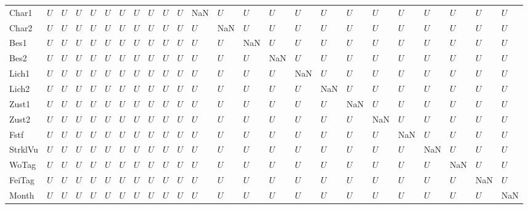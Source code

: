 \begin{tabular}{llllllllllllllllllllllll}
Char1   &     $U$ &  $U$ &  $U$ &   $U$ &   $U$ &   $U$ &   $U$ &   $U$ &   $U$ &   $U$ &   NaN &   $U$ &  $U$ &  $U$ &   $U$ &   $U$ &   $U$ &   $U$ &  $U$ &     $U$ &   $U$ &    $U$ &   $U$ \\
Char2   &     $U$ &  $U$ &  $U$ &   $U$ &   $U$ &   $U$ &   $U$ &   $U$ &   $U$ &   $U$ &   $U$ &   NaN &  $U$ &  $U$ &   $U$ &   $U$ &   $U$ &   $U$ &  $U$ &     $U$ &   $U$ &    $U$ &   $U$ \\
Bes1    &     $U$ &  $U$ &  $U$ &   $U$ &   $U$ &   $U$ &   $U$ &   $U$ &   $U$ &   $U$ &   $U$ &   $U$ &  NaN &  $U$ &   $U$ &   $U$ &   $U$ &   $U$ &  $U$ &     $U$ &   $U$ &    $U$ &   $U$ \\
Bes2    &     $U$ &  $U$ &  $U$ &   $U$ &   $U$ &   $U$ &   $U$ &   $U$ &   $U$ &   $U$ &   $U$ &   $U$ &  $U$ &  NaN &   $U$ &   $U$ &   $U$ &   $U$ &  $U$ &     $U$ &   $U$ &    $U$ &   $U$ \\
Lich1   &     $U$ &  $U$ &  $U$ &   $U$ &   $U$ &   $U$ &   $U$ &   $U$ &   $U$ &   $U$ &   $U$ &   $U$ &  $U$ &  $U$ &   NaN &   $U$ &   $U$ &   $U$ &  $U$ &     $U$ &   $U$ &    $U$ &   $U$ \\
Lich2   &     $U$ &  $U$ &  $U$ &   $U$ &   $U$ &   $U$ &   $U$ &   $U$ &   $U$ &   $U$ &   $U$ &   $U$ &  $U$ &  $U$ &   $U$ &   NaN &   $U$ &   $U$ &  $U$ &     $U$ &   $U$ &    $U$ &   $U$ \\
Zust1   &     $U$ &  $U$ &  $U$ &   $U$ &   $U$ &   $U$ &   $U$ &   $U$ &   $U$ &   $U$ &   $U$ &   $U$ &  $U$ &  $U$ &   $U$ &   $U$ &   NaN &   $U$ &  $U$ &     $U$ &   $U$ &    $U$ &   $U$ \\
Zust2   &     $U$ &  $U$ &  $U$ &   $U$ &   $U$ &   $U$ &   $U$ &   $U$ &   $U$ &   $U$ &   $U$ &   $U$ &  $U$ &  $U$ &   $U$ &   $U$ &   $U$ &   NaN &  $U$ &     $U$ &   $U$ &    $U$ &   $U$ \\
Fstf    &     $U$ &  $U$ &  $U$ &   $U$ &   $U$ &   $U$ &   $U$ &   $U$ &   $U$ &   $U$ &   $U$ &   $U$ &  $U$ &  $U$ &   $U$ &   $U$ &   $U$ &   $U$ &  NaN &     $U$ &   $U$ &    $U$ &   $U$ \\
StrklVu &     $U$ &  $U$ &  $U$ &   $U$ &   $U$ &   $U$ &   $U$ &   $U$ &   $U$ &   $U$ &   $U$ &   $U$ &  $U$ &  $U$ &   $U$ &   $U$ &   $U$ &   $U$ &  $U$ &     NaN &   $U$ &    $U$ &   $U$ \\
WoTag   &     $U$ &  $U$ &  $U$ &   $U$ &   $U$ &   $U$ &   $U$ &   $U$ &   $U$ &   $U$ &   $U$ &   $U$ &  $U$ &  $U$ &   $U$ &   $U$ &   $U$ &   $U$ &  $U$ &     $U$ &   NaN &    $U$ &   $U$ \\
FeiTag  &     $U$ &  $U$ &  $U$ &   $U$ &   $U$ &   $U$ &   $U$ &   $U$ &   $U$ &   $U$ &   $U$ &   $U$ &  $U$ &  $U$ &   $U$ &   $U$ &   $U$ &   $U$ &  $U$ &     $U$ &   $U$ &    NaN &   $U$ \\
Month   &     $U$ &  $U$ &  $U$ &   $U$ &   $U$ &   $U$ &   $U$ &   $U$ &   $U$ &   $U$ &   $U$ &   $U$ &  $U$ &  $U$ &   $U$ &   $U$ &   $U$ &   $U$ &  $U$ &     $U$ &   $U$ &    $U$ &   NaN \\
\bottomrule
\end{tabular}
